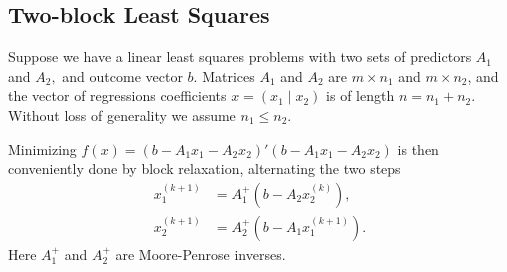 \documentclass[
  12pt,
]{book}
\begin{document}
\hypertarget{blockrelaxation:firstexamples:twoblockleastsquares}{%
\subsection{Two-block Least Squares}\label{blockrelaxation:firstexamples:twoblockleastsquares}}

Suppose we have a linear least squares problems with two sets
of predictors \(A_1\) and \(A_2,\) and outcome vector \(b\).
Matrices \(A_1\) and \(A_2\) are \(m\times n_1\) and \(m\times n_2\), and the vector of regressions coefficients \(x=(x_1\mid x_2)\) is of length \(n=n_1+n_2.\) Without loss of generality we assume \(n_1\leq n_2\).

Minimizing \(f(x)=(b-A_1x_1-A_2x_2)'(b-A_1x_1-A_2x_2)\)
is then conveniently done by block relaxation, alternating the
two steps
\begin{align*}
x_1^{(k+1)}&=A_1^+(b-A_2x_2^{(k)}),\\
x_2^{(k+1)}&=A_2^+(b-A_1x_1^{(k+1)}).
\end{align*}
Here \(A_1^+\) and \(A_2^+\) are Moore-Penrose inverses.
\end{document}
